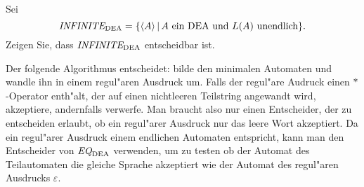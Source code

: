 Sei
\[
\text{\it INFINITE}_{\text{DEA}}
=
\{
\langle A\rangle\,|\,\text{$A$ ein DEA und $L(A)$ unendlich}
\}.
\]
Zeigen Sie, dass $\text{\it INFINITE}_{\text{DEA}}$
entscheidbar ist.

\begin{loesung}
Der folgende Algorithmus entscheidet: bilde den minimalen Automaten und
wandle ihn in einem regul"aren Ausdruck um. Falls der regul"are
Audruck einen $*$-Operator enth"alt, der auf einen nichtleeren
Teilstring angewandt wird, akzeptiere, andernfalls verwerfe.
Man braucht also nur einen Entscheider, der  zu entscheiden erlaubt,
ob ein regul"arer Ausdruck nur das leere Wort akzeptiert. Da ein
regul"arer Ausdruck einem endlichen Automaten entspricht, kann man
den Entscheider von $\text{\it EQ}_{\text{DEA}}$ verwenden, um zu
testen ob der Automat des Teilautomaten die gleiche Sprache akzeptiert
wie der Automat des regul"aren Ausdrucks $\varepsilon$.
\end{loesung}
